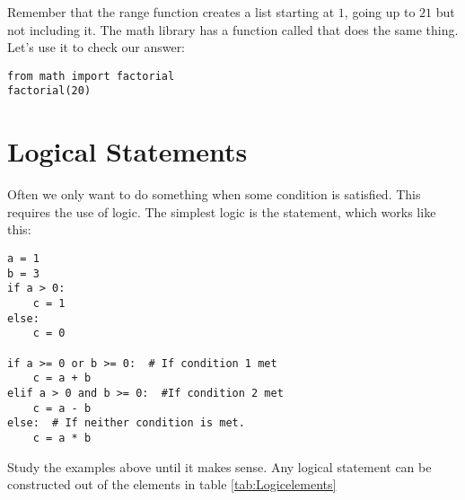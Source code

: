 Remember that the range function creates a list starting at $1$, going
up to $21$ but not including it. The math library has a function
called  that does the same thing.  Let's use it to
check our answer:

\begin{Verbatim}
from math import factorial
factorial(20)
\end{Verbatim}

\section{Logical Statements}
 Often we only want to do something when some condition is satisfied.
This requires the use of logic.  The simplest logic is the 
statement, which works like this:
\begin{Verbatim}
a = 1
b = 3
if a > 0:
    c = 1
else:
    c = 0

if a >= 0 or b >= 0:  # If condition 1 met
    c = a + b
elif a > 0 and b >= 0:  #If condition 2 met
    c = a - b
else:  # If neither condition is met.
    c = a * b
\end{Verbatim}
Study the examples above until it makes sense.  Any logical statement
can be constructed out of the elements in table
\ref{tab:Logicelements}

